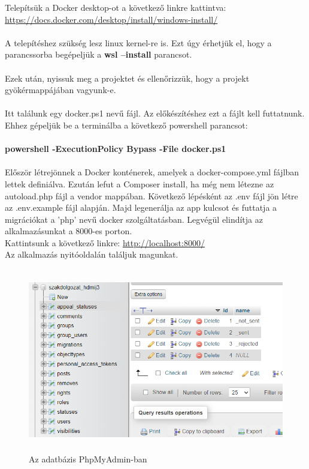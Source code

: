 \documentclass[
]{thesis-ekf}
\theoremstyle{definition}
\theoremstyle{remark}
\begin{document}
Telepítsük a Docker desktop-ot a következő linkre kattintva:\\
\url{https://docs.docker.com/desktop/install/windows-install/}
\\\\
A telepítéshez szükség lesz linux kernel-re is. Ezt úgy érhetjük el, hogy a parancssorba begépeljük a \textbf{wsl --install} parancsot.
\\\\
Ezek után, nyissuk meg a projektet és ellenőrizzük, hogy a projekt gyökérmappájában vagyunk-e.
\\\\
Itt találunk egy docker.ps1 nevű fájl. Az előkészítéshez ezt a fájlt kell futtatnunk. Ehhez gépeljük be a terminálba a következő powershell parancsot:
\\\\
\textbf{powershell -ExecutionPolicy Bypass -File docker.ps1}
\\\\
Először létrejönnek a Docker konténerek, amelyek a docker-compose.yml fájlban lettek definiálva. Ezután lefut a Composer install, ha még nem létezne az autoload.php fájl a vendor mappában. Következő lépésként az .env fájl jön létre az .env.example fájl alapján. Majd legenerálja az app kulcsot és futtatja a migrációkat a 'php' nevű docker szolgáltatásban. Legvégül elindítja az alkalmazásunkat a 8000-es porton.
\\
Kattintsunk a következő linkre: \url{http://localhost:8000/}
\\
Az alkalmazás nyitóoldalán találjuk magunkat.
\begin{figure}[H]
	\centering
	\includegraphics[width=15cm, height=8cm]{phpmyadmin}
	\caption{Az adatbázis PhpMyAdmin-ban}
	\label{fig:picture}
\end{figure}
\end{document}
